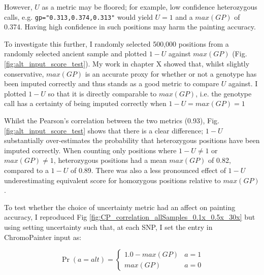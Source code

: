 However, $U$ as a metric may be floored; for example, low confidence heterozygous calls, e.g. \texttt{gp="0.313,0.374,0.313"} would yield $U=1$ and a $max(GP)$ of 0.374. Having high confidence in such positions may harm the painting accuracy.

To investigate this further, I randomly selected 500,000 positions from a randomly selected ancient sample and plotted $1-U$ against $max(GP)$ (Fig. \ref{fig:alt_input_score_test}). My work in chapter X showed that, whilst slightly conservative, $max(GP)$ is an accurate proxy for whether or not a genotype has been imputed correctly and thus stands as a good metric to compare $U$ against. I plotted $1-U$ so that it is directly comparable to $max(GP)$, i.e. the genotype call has a certainty of being imputed correctly when $1-U = max(GP) = 1$

Whilst the Pearson's correlation between the two metrics (0.93), Fig. \ref{fig:alt_input_score_test} shows that there is a clear difference; $1-U$ substantially over-estimates the probability that heterozygous positions have been imputed correctly. When counting only positions where $1-U \neq 1$ or $max(GP) \neq 1$, heterozygous positions had a mean $max(GP)$ of 0.82, compared to a $1-U$ of 0.89. There was also a less pronounced effect of $1-U$ underestimating equivalent score for homozygous positions relative to $max(GP)$.   


To test whether the choice of uncertainty metric had an affect on painting accuracy, I reproduced Fig \ref{fig:CP_correlation_allSamples_0.1x_0.5x_30x} but using setting uncertainty such that, at each SNP, I set the entry in ChromoPainter input as:

\begin{equation} \label{eq:cp_input_test}
\Pr(a = alt) =     
	\begin{cases}
		1.0 - max(GP) &  a = 1 \\
		max(GP) & a = 0  
	\end{cases}       
\end{equation}

